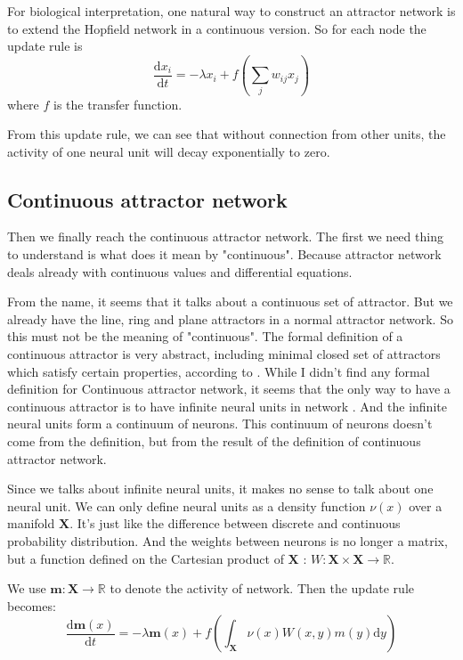 \documentclass{article}
\begin{document}
	For biological interpretation, one natural way to construct an attractor network is to extend the Hopfield network in a continuous version. So for each node the update rule is
	\begin{equation}
	\frac{\mathrm{d}x_i}{\mathrm{d}t} = -\lambda x_i + f(\sum_j w_{ij} x_j)
	\end{equation}
	where $f$ is the transfer function.
	
	From this update rule, we can see that without connection from other units, the activity of one neural unit will decay exponentially to zero.
	
	\subsection{Continuous attractor network}
	Then we finally reach the continuous attractor network. The first we need thing to understand is what does it mean by "continuous". Because attractor network deals already with continuous values and differential equations.
	
	From the name, it seems that it talks about a continuous set of attractor. But we already have the line, ring and plane attractors in a normal attractor network. So this must not be the meaning of "continuous". The formal definition of a continuous attractor is very abstract, including minimal closed set of attractors which satisfy certain properties, according to \cite{CANN}. While I didn't find any formal definition for Continuous attractor network, it seems that the only way to have a continuous attractor is to have infinite neural units in network \cite{trappenberg2003continuous}. And the infinite neural units form a continuum of neurons. This continuum of neurons doesn't come from the definition, but from the result of the definition of continuous attractor network.
	
	Since we talks about infinite neural units, it makes no sense to talk about one neural unit. We can only define neural units as a density function $\nu(x)$ over a manifold $\mathbf{X}$. It's just like the difference between discrete and continuous probability distribution. And the weights between neurons is no longer a matrix, but a function defined on the Cartesian product of $\mathbf{X}$ : $W:\mathbf{X}\times \mathbf{X} \rightarrow \mathbb{R} $. 
	
	We use $\mathbf{m}:\mathbf{X}\rightarrow\mathbb{R}$ to denote the activity of network. Then the update rule becomes:
	\begin{equation}
	\frac{\mathrm{d}\mathbf{m}(x)}{\mathrm{d}t} = -\lambda \mathbf{m}(x) + f(\int_{\mathbf{X}}\nu(x)W(x,y)m(y)\mathrm{d}y)
	\end{equation}
	
\end{document}

